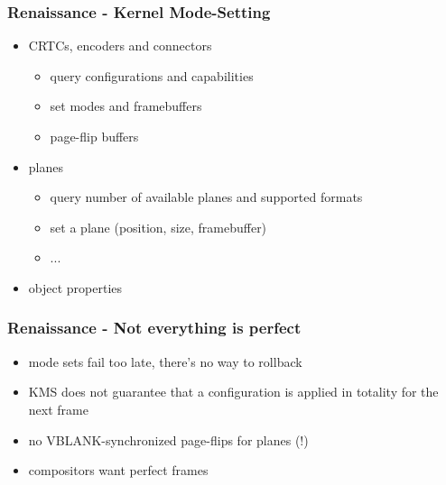 \documentclass[t]{beamer}
\begin{document}
\begin{frame}
	\frametitle{Renaissance - Kernel Mode-Setting}
	\begin{itemize}
		\item CRTCs, encoders and connectors
			\begin{itemize}
				\item query configurations and capabilities
				\item set modes and framebuffers
				\item page-flip buffers
			\end{itemize}
		\item planes
			\begin{itemize}
				\item query number of available planes and supported formats
				\item set a plane (position, size, framebuffer)
				\item ...
			\end{itemize}
		\item object properties
	\end{itemize}
\end{frame}

\begin{frame}
	\frametitle{Renaissance - Not everything is perfect}
	\begin{itemize}
		\item mode sets fail too late, there's no way to rollback
		\item KMS does not guarantee that a configuration is applied in
			totality for the next frame
		\item no VBLANK-synchronized page-flips for planes (!)
		\item compositors want perfect frames
	\end{itemize}
\end{frame}
\end{document}
